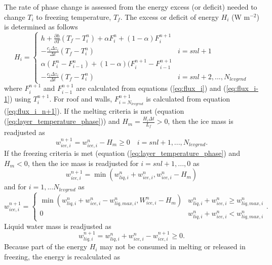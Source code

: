 \documentclass[12pt,authoryear]{elsarticle}
\numberwithin{equation}{section} %
\begin{document}
The rate of phase change is assessed from the energy excess (or deficit) needed to change $T_{i}$ to freezing temperature, $T_{f}$. The excess or deficit of energy $H_{i}$ (W m$^{-2}$) is determined as follows
\begin{equation}
H_{i} = 
\begin{cases}
h+\frac{\partial h}{\partial T}(T_{f}-T_{i}^{n})+\alpha F_{i}^{n}+(1-\alpha)F_{i}^{n+1} & \\
-\frac{c_{i}\Delta z_{i}}{\Delta t}(T_{f}-T_{i}^{n}) & i=snl+1 \\
\alpha(F_{i}^{n}-F_{i-1}^{n})+(1-\alpha)(F_{i}^{n+1}-F_{i-1}^{n+1} & \\
-\frac{c_{i}\Delta z_{i}}{\Delta t}(T_{f}-T_{i}^{n}) & i=snl+2,...,N_{levgrnd}
\end{cases}
\end{equation}
where $F_{i}^{n+1}$ and $F_{i-1}^{n+1}$ are calculated from equations (\ref{eq:flux_i}) and (\ref{eq:flux_i-1}) using $T_{i}^{n+1}$. For roof and walls, $F_{i=N_{levgrnd}}^{n+1}$ is calculated from equation (\ref{eq:flux_i_n+1}). If the melting criteria is met (equation (\ref{eq:layer_temperature_phase})) and $H_{m}=\frac{H_{i}\Delta t}{L_{f}}>$0, then the ice mass is readjusted as 
\begin{equation}
\label{eq:ice_mass_adjusted}
w_{ice,i}^{n+1} = w_{ice,i}^{n}-H_{m}\geq0 \quad i=snl+1,...,N_{levgrnd}.
\end{equation}
If the freezing criteria is met (equation (\ref{eq:layer_temperature_phase}) and $H_{m}<$0, then the ice mass is
readjusted for $i=snl+1,...,0$ as
\begin{equation}
w_{ice,i}^{n+1} = \min(w_{liq,i}^{n}+w_{ice,i}^{n}, w_{ice,i}^{n}-H_{m})
\end{equation}
and for $i=1,...N_{levgrnd}$ as
\begin{equation}
w_{ice,i}^{n+1} = 
\begin{cases}
\min(w_{liq,i}^{n}+w_{ice,i}^{n}-w_{liq,max,i}^{n},W_{ice,i}^{n}-H_{m}) & w_{liq,i}^{n}+w_{ice,i}^{n}\geq w_{liq,max,i}^{n}\\
0 & w_{liq,i}^{n}+w_{ice,i}^{n} < w_{liq,max,i}^{n}
\end{cases}.
\end{equation}
Liquid water mass is readjusted as
\begin{equation}
\label{eq:liquid_water_mass_adjusted}
w_{liq,i}^{n+1} = w_{liq,i}^{n}+w_{ice,i}^{n}-w_{ice,i}^{n+1}\geq0.
\end{equation}
Because part of the energy $H_{i}$ may not be consumed in melting or released in freezing, the energy is recalculated as 
\end{document}
